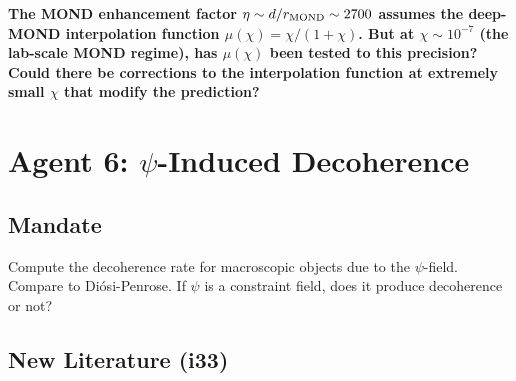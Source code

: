 \documentclass[11pt,a4paper]{article}
\begin{document}
\textbf{The MOND enhancement factor $\eta \sim d/r_{\rm MOND} \sim 2700$ assumes the deep-MOND interpolation function $\mu(\chi) = \chi/(1+\chi)$. But at $\chi \sim 10^{-7}$ (the lab-scale MOND regime), has $\mu(\chi)$ been tested to this precision? Could there be corrections to the interpolation function at extremely small $\chi$ that modify the prediction?}

\newpage

\section{Agent 6: $\psi$-Induced Decoherence}
\label{sec:agent6}

\subsection{Mandate}

Compute the decoherence rate for macroscopic objects due to the $\psi$-field. Compare to Di\'{o}si-Penrose. If $\psi$ is a constraint field, does it produce decoherence or not?

\subsection{New Literature (i33)}
\end{document}
